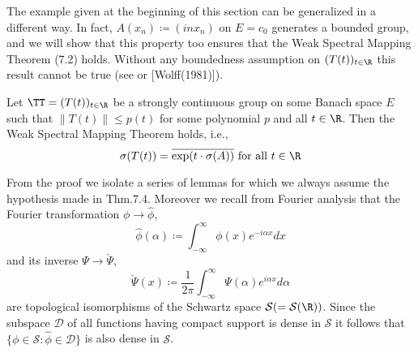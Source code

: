 \medskip

The example given at the beginning of this section can be generalized in a different way.
In fact, $A(x_{n}) \coloneqq (inx_{n})$ on $E = c_{0}$ generates a bounded group, and we will show that this property too ensures that the Weak Spectral Mapping Theorem (7.2) holds.
Without any boundedness assumption on $(T(t))_{t\in\R}$ this result cannot be true (see \citet[Sec.23.16]{hillephillips:1957} or [Wolff(1981)]).


\begin{theorem}\label{thm:a3-7.4}
Let $\TT = (T(t))_{t\in\R}$ be a strongly continuous group on some Banach space $E$ such that $\|T(t)\| \leq p(t)$ for some polynomial $p$ and all $t \in \R$.
Then the Weak Spectral Mapping Theorem holds, i.e.,
\[
\sigma(T(t)) = \overline{\exp(t\cdot\sigma(A))} \text{ for all } t \in \R
\]
\end{theorem}

From the proof we isolate a series of lemmas for which we always assume the hypothesis made in Thm.7.4.
Moreover we recall from Fourier analysis that the Fourier transformation $\phi \to \hat{\phi}$,
\[
\hat{\phi}(\alpha) \coloneqq \int_{-\infty}^{\infty} \phi(x)e^{-i\alpha x} dx
\]
and its inverse $\Psi \to \check{\Psi}$,
\[
\check{\Psi}(x) \coloneqq \frac{1}{2\pi}\int_{-\infty}^{\infty} \Psi(\alpha)e^{i\alpha x} d\alpha
\]
are topological isomorphisms of the Schwartz space $\mathcal{S} ( = \mathcal{S}(\R))$.
Since the subspace $\mathcal{D}$ of all functions having compact support is dense in $\mathcal{S}$ it follows that $\{\phi \in \mathcal{S} \colon \hat{\phi} \in \mathcal{D}\}$ is also dense in $\mathcal{S}$.

